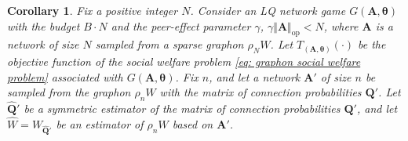 \documentclass[11pt]{article}
\newcommand{\op}{\mathrm{op}}
\newcommand{\bA}{\bm{A}}
\newcommand{\bQ}{\bm{Q}}
\newcommand{\btheta}{\bm{\theta}}
\newcommand{\<}{\langle}
\renewcommand{\>}{\rangle}
\theoremstyle{plain}
\newtheorem{corollary}{Corollary}
\theoremstyle{definition}
\theoremstyle{remark}
\begin{document}
\begin{corollary}
\label{corollary: convergene rate targeted interventions}
   Fix a positive integer $N$. Consider an LQ network game $G(\bA,\btheta)$ with the budget $B \cdot N$ and the peer-effect parameter $\gamma$, $\gamma \Vert \bA \Vert_{\op} < N$, where $\bA$ is a network of size $N$ sampled from a sparse graphon $\rho_N W$.
    Let $T_{(\bA,\btheta)}(\cdot)$ be the objective function of the social welfare problem \eqref{eq: graphon social welfare problem} associated with $G(\bA,\btheta)$. Fix $n$, and let a network $\bA'$ of size $n$ be sampled from the graphon $\rho_n W$ with the matrix of connection probabilities $\bQ'$. Let $\widehat{\bQ}'$ be a symmetric estimator of the matrix of connection probabilities $\bQ'$, and let $\widehat{W} = W_{\widehat{\bQ}'}$ be an estimator of $\rho_n W$ based on $\bA'$.
    

\end{corollary}
\end{document}

